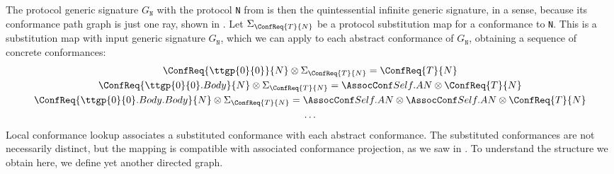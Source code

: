\documentclass[../generics]{subfiles}
\begin{document}
\begin{figure}\label{ray conformance path graph}
\begin{center}
\end{center}
\end{figure}

The protocol generic signature $G_\texttt{N}$ with the protocol \texttt{N} from  is then the quintessential infinite generic signature, in a sense, because its conformance path graph is just one ray, shown in . Let $\Sigma_{\ConfReq{T}{N}}$ be a protocol substitution map for a conformance to \texttt{N}. This is a substitution map with input generic signature $G_\texttt{N}$, which we can apply to each abstract conformance of $G_\texttt{N}$, obtaining a sequence of concrete conformances:
\begin{gather*}
\ConfReq{\ttgp{0}{0}}{N}\otimes\Sigma_{\ConfReq{T}{N}}=\ConfReq{T}{N}\\
\ConfReq{\ttgp{0}{0}.Body}{N}\otimes\Sigma_{\ConfReq{T}{N}}=\SelfAToN\otimes\ConfReq{T}{N}\\
\ConfReq{\ttgp{0}{0}.Body.Body}{N}\otimes\Sigma_{\ConfReq{T}{N}}=\SelfAToN\otimes\SelfAToN\otimes\ConfReq{T}{N}\\
\ldots
\end{gather*}
Local conformance lookup associates a substituted conformance with each abstract conformance. The substituted conformances are not necessarily distinct, but the mapping is compatible with associated conformance projection, as we saw in . To understand the structure we obtain here, we define yet another directed graph.
\end{document}
